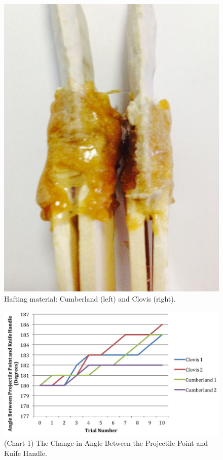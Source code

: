 \begin{figure}[!p]
	\centering
	\includegraphics[width=.95\linewidth]{figures/gagglioli_Fig6}
	\caption{Hafting material: Cumberland (left) and Clovis (right).}
	\label{fig:gagglioli_Fig6}
\end{figure}

\begin{figure}[!p]
	\includegraphics[width=\linewidth]{figures/gagglioli_Chart1}
	\centering
	\caption{(Chart 1) The Change in Angle Between the Projectile Point and Knife Handle.}
	\label{fig:Chart1}
\end{figure}



